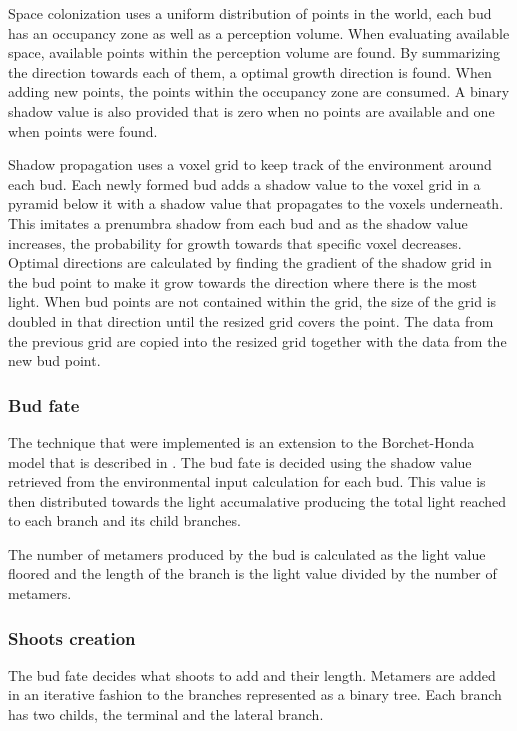 \documentclass[11pt]{article} %
\begin{document}
Space colonization uses a uniform distribution of points in the world, each bud has an occupancy zone as well as a perception volume.
When evaluating available space, available points within the perception volume are found.
By summarizing the direction towards each of them, a optimal growth direction is found.
When adding new points, the points within the occupancy zone are consumed.
A binary shadow value is also provided that is zero when no points are available and one when points were found.

Shadow propagation uses a voxel grid to keep track of the environment around each bud.
Each newly formed bud adds a shadow value to the voxel grid in a pyramid below it with a shadow value that propagates to the voxels underneath.
This imitates a prenumbra shadow from each bud and as the shadow value increases, the probability for growth towards that specific voxel decreases.
Optimal directions are calculated by finding the gradient of the shadow grid in the bud point to make it grow towards the direction where there is the most light.
When bud points are not contained within the grid, the size of the grid is doubled in that direction until the resized grid covers the point.
The data from the previous grid are copied into the resized grid together with the data from the new bud point.

\subsubsection{Bud fate}
The technique that were implemented is an extension to the Borchet-Honda model that is described in \citet{palubicki}.
The bud fate is decided using the shadow value retrieved from the environmental input calculation for each bud.
This value is then distributed towards the light accumalative producing the total light reached to each branch and its child branches.

The number of metamers produced by the bud is calculated as the light value floored and the length of the branch is the light value divided by the number of metamers.

\subsubsection{Shoots creation}
The bud fate decides what shoots to add and their length.
Metamers are added in an iterative fashion to the branches represented as a binary tree.
Each branch has two childs, the terminal and the lateral branch.
\end{document}
